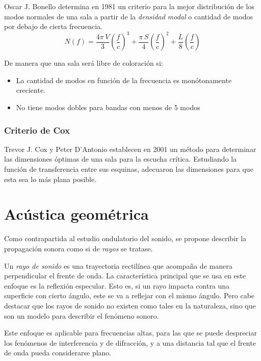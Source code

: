 \documentclass[a5paper,12pt,twoside]{book}
\begin{document}
Oscar J. Bonello determina en 1981 un criterio para la mejor distribución de los modos normales de una sala a partir de la \emph{densidad modal} o cantidad de modos por debajo de cierta frecuencia.
\begin{equation*}
    N(f) = \frac{4\pi\,V}{3} \left(\frac{f}{c}\right)^3 + \frac{\pi \, S}{4} \left(\frac{f}{c}\right)^2 + \frac{L}{8} \left(\frac{f}{c}\right)
\end{equation*}

De manera que una sala será libre de coloración si:
\begin{itemize}
    \item La cantidad de modos en función de la frecuencia es monótonamente creciente.
    \item No tiene modos dobles para bandas con menos de 5 modos
\end{itemize} 


\subsection{Criterio de Cox}

Trevor J. Cox y Peter D'Antonio establecen en 2001 un método para determinar las dimensiones óptimas de una sala para la escucha crítica. Estudiando la función de transferencia entre sus esquinas, adecuaron las dimensiones para que esta sea lo más plana posible.


\chapter{Acústica geométrica}

Como contrapartida al estudio ondulatorio del sonido, se propone describir la propagación sonora como si de \emph{rayos} se tratase.

Un \emph{rayo de sonido} es una trayectoria rectilínea que acompaña de manera perpendicular el frente de onda. La característica principal que se usa en este enfoque es la reflexión especular. Esto es, si un rayo impacta contra una superficie con cierto ángulo, este se va a reflejar con el mismo ángulo. Pero cabe destacar que los rayos de sonido no existen como tales en la naturaleza, sino que son un modelo para describir el fenómeno sonoro.

Este enfoque es aplicable para frecuencias altas, para las que se puede despreciar los fenómenos de interferencia y de difracción, y a una distancia tal que el frente de onda pueda considerarse plano.
\end{document}
